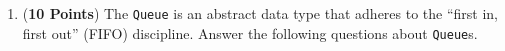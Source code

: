 \documentclass[12pt]{article}
\begin{document}
\begin{enumerate}

  \item ({\bf 10 Points}) The {\tt Queue} is an abstract data type that
    adheres to the ``first in, first out'' (FIFO) discipline.  Answer
    the following questions about {\tt Queue}s.

    \begin{enumerate}





\end{enumerate}
\end{enumerate}
\end{document}
